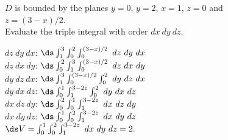 {\label{13_06_ex_08}$D$ is bounded by the planes $y=0$, $y=2$,  $x=1$, $z=0$ and\\
 $z=(3-x)/2$.\\

Evaluate the triple integral with order $dx\ dy\ dz$.

}
{	$dz\ dy\ dx$: $\ds\int_1^3\int_0^{2}\int_0^{(3-x)/2}\ dz\ dy\ dx$\\
	$dz\ dx\ dy$: $\ds\int_0^2\int_1^{3}\int_0^{(3-x)/2}\ dz\ dx\ dy$\\
	$dy\ dz\ dx$: $\ds\int_1^3\int_0^{(3-x)/2}\int_0^{2}\ dy\ dz\ dx$\\
	$dy\ dx\ dz$: $\ds\int_0^1\int_1^{3-2z}\int_0^{2}\ dy\ dx\ dz$\\
	$dx\ dz\ dy$: $\ds\int_0^2\int_0^{1}\int_1^{3-2z}\ dx\ dz\ dy$\\
	$dx\ dy\ dz$: $\ds\int_0^1\int_0^{2}\int_1^{3-2z}\ dx\ dy\ dz$\\
	
	$\ds V = \int_0^1\int_0^{2}\int_1^{3-2z}\ dx\ dy\ dz =2.$
}
